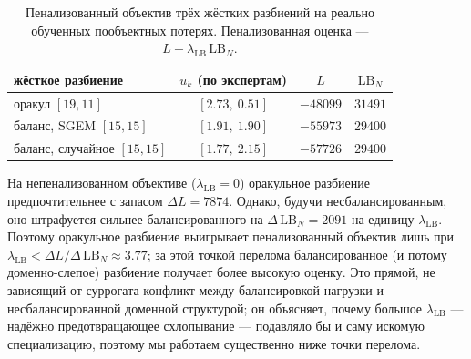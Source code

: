 \begin{table}[h]
\centering
\caption{Пенализованный объектив трёх жёстких разбиений на реально
обученных пообъектных потерях. Пенализованная оценка ---
$L - \lambda_{\text{LB}}\,\mathrm{LB}_N$.}
\label{tab:lambda}
\begin{tabular}{lccc}
\toprule
жёсткое разбиение & $u_k$ (по экспертам) & $L$ & $\mathrm{LB}_N$ \\
\midrule
оракул $[19, 11]$ & $[2.73,\ 0.51]$ & $-48099$ & $31491$ \\
баланс, SGEM $[15, 15]$ & $[1.91,\ 1.90]$ & $-55973$ & $29400$ \\
баланс, случайное $[15, 15]$ & $[1.77,\ 2.15]$ & $-57726$ & $29400$ \\
\bottomrule
\end{tabular}
\end{table}

На непенализованном объективе ($\lambda_{\text{LB}}=0$) оракульное
разбиение предпочтительнее с запасом $\Delta L = 7874$. Однако, будучи
несбалансированным, оно штрафуется сильнее балансированного на
$\Delta\,\mathrm{LB}_N = 2091$ на единицу $\lambda_{\text{LB}}$. Поэтому
оракульное разбиение выигрывает пенализованный объектив лишь при
$\lambda_{\text{LB}} < \Delta L / \Delta\,\mathrm{LB}_N \approx 3.77$; за
этой точкой перелома балансированное (и потому доменно-слепое) разбиение
получает более высокую оценку. Это прямой, не зависящий от суррогата
конфликт между балансировкой нагрузки и несбалансированной доменной
структурой; он объясняет, почему большое $\lambda_{\text{LB}}$ ---
надёжно предотвращающее схлопывание --- подавляло бы и саму искомую
специализацию, поэтому мы работаем существенно ниже точки перелома.
